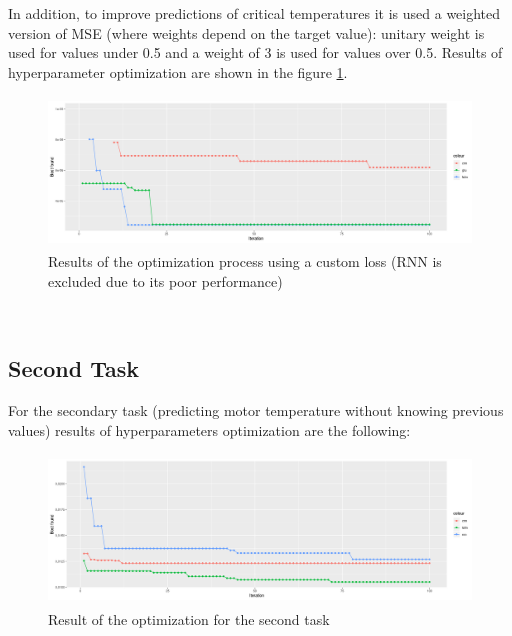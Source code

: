 In addition, to improve predictions of critical temperatures it is used a weighted version of MSE (where weights depend on the target value): unitary weight is used for values under 0.5 and a weight of 3 is used for values over 0.5.
Results of hyperparameter optimization are shown in the figure \ref{fig:automl_custom}.
\begin{figure}[!h]
    \centering
    \includegraphics[width=\linewidth, height=4cm]{imgs/comparison_MSE_new_loss.png}
    \caption{Results of the optimization process using a custom loss (RNN is excluded due to its poor performance)}
    \label{fig:automl_custom}
\end{figure}\\
  
\subsection{Second Task}
For the secondary task (predicting motor temperature without knowing previous values) results of hyperparameters optimization are the following:
\begin{figure}[!h]
    \centering
    \includegraphics[width=\linewidth, height=4cm]{imgs/comparison_MSE_second.png}
    \caption{Result of the optimization for the second task}
    \label{fig:second_task}
\end{figure}  


